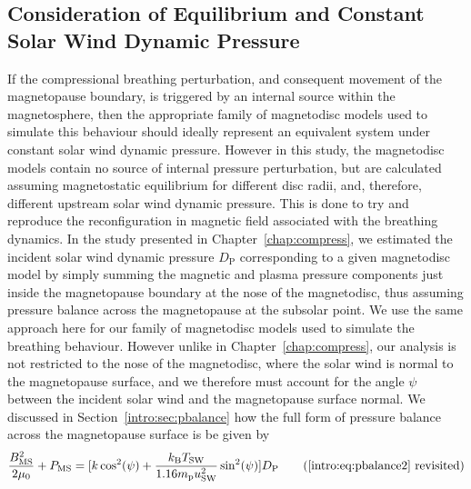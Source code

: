 \subsection{Consideration of Equilibrium and Constant Solar Wind Dynamic Pressure}\label{equinox:sec:constDp}
If the compressional breathing perturbation, and consequent movement of the magnetopause boundary, is triggered by an internal source within the magnetosphere, then the appropriate family of magnetodisc models used to simulate this behaviour should ideally represent an equivalent system under constant solar wind dynamic pressure. However in this study, the magnetodisc models contain no source of internal pressure perturbation, but are calculated assuming magnetostatic equilibrium for different disc radii, and, therefore, different upstream solar wind dynamic pressure. This is done to try and reproduce the reconfiguration in magnetic field associated with the breathing dynamics. In the study presented in Chapter~\ref{chap:compress}, we estimated the incident solar wind dynamic pressure $D_\mathrm{P}$ corresponding to a given magnetodisc model by simply summing the magnetic and plasma pressure components just inside the magnetopause boundary at the nose of the magnetodisc, thus assuming pressure balance across the magnetopause at the subsolar point. We use the same approach here for our family of magnetodisc models used to simulate the breathing behaviour. However unlike in Chapter~\ref{chap:compress}, our analysis is not restricted to the nose of the magnetodisc, where the solar wind is normal to the magnetopause surface, and we therefore must account for the angle $\psi$ between the incident solar wind and the magnetopause surface normal. We discussed in Section~\ref{intro:sec:pbalance} how the full form of pressure balance across the magnetopause surface is be given by 
\begin{equation*}\label{equinox:eq:pbalance}
\frac{B_\mathrm{MS}^2}{2\mu_0} + P_\mathrm{MS} = [k\cos^2(\psi) + \frac{k_\mathrm{B}T_\mathrm{SW}}{1.16m_\mathrm{p}u_\mathrm{SW}^2}\sin^2(\psi)] D_\mathrm{P} \tag{\ref{intro:eq:pbalance2} revisited}
\end{equation*}
